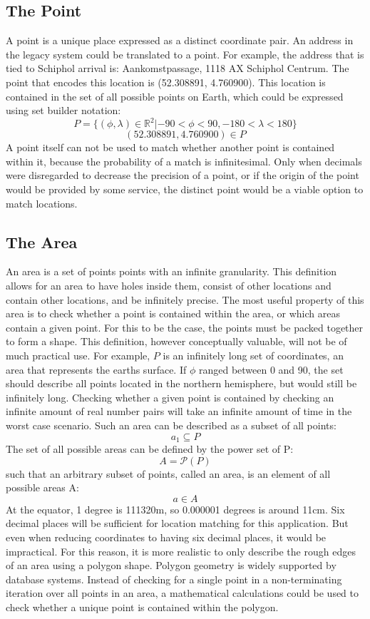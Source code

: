 \subsection{The Point}
A point is a unique place expressed as a distinct coordinate pair. An address in the legacy system could be translated to a point. For example, the address that is tied to Schiphol arrival is: Aankomstpassage, 1118 AX Schiphol Centrum.
The point that encodes this location is (52.308891, 4.760900). This location is contained in the set of all possible points on Earth, which could be expressed using set builder notation:
\[P = \{(\phi,\lambda) \in \mathbb{R}^2 | -90 < \phi < 90, -180 < \lambda < 180 \}\]
\[(52.308891, 4.760900) \in P\]
A point itself can not be used to match whether another point is contained within it, because the probability of a match is infinitesimal. Only when decimals were disregarded to decrease the precision of a point, or if the origin of the point would be provided by some service, the distinct point would be a viable option to match locations.

\subsection{The Area}
An area is a set of points points with an infinite granularity. This definition allows for an area to have holes inside them, consist of other locations and contain other locations, and be infinitely precise. The most useful property of this area is to check whether a point is contained within the area, or which areas contain a given point. For this to be the case, the points must be packed together to form a shape. This definition, however conceptually valuable, will not be of much practical use. For example, $P$ is an infinitely long set of coordinates, an area that represents the earths surface. If $\phi$ ranged between 0 and 90, the set should describe all points located in the northern hemisphere, but would still be infinitely long. Checking whether a given point is contained by checking an infinite amount of real number pairs will take an infinite amount of time in the worst case scenario. Such an area can be described as a subset of all points:
\[a_1 \subseteq P \]
The set of all possible areas can be defined by the power set of P:
\[A = \mathcal{P}(P)\]
such that an arbitrary subset of points, called an area, is an element of all possible areas A:
\[a \in A\]
At the equator, 1 degree is 111320m, so 0.000001 degrees is
around 11cm. Six decimal places will be sufficient for location matching for this application. But even when reducing coordinates to having six decimal places, it would be impractical. For this reason, it is more realistic to only describe the rough edges of an area using a polygon shape. Polygon geometry is widely supported by database systems. Instead of checking for a single point in a non-terminating iteration over all points in an area, a mathematical calculations could be used to check whether a unique point is contained within the polygon.

